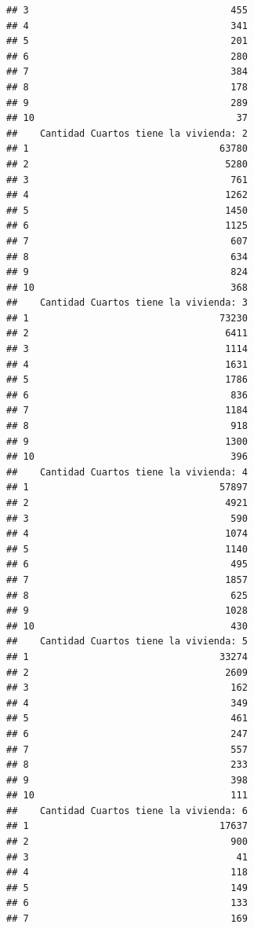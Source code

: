 \documentclass[11pt,]{article}
\begin{document}
\begin{verbatim}
## 3                                    455
## 4                                    341
## 5                                    201
## 6                                    280
## 7                                    384
## 8                                    178
## 9                                    289
## 10                                    37
##    Cantidad Cuartos tiene la vivienda: 2
## 1                                  63780
## 2                                   5280
## 3                                    761
## 4                                   1262
## 5                                   1450
## 6                                   1125
## 7                                    607
## 8                                    634
## 9                                    824
## 10                                   368
##    Cantidad Cuartos tiene la vivienda: 3
## 1                                  73230
## 2                                   6411
## 3                                   1114
## 4                                   1631
## 5                                   1786
## 6                                    836
## 7                                   1184
## 8                                    918
## 9                                   1300
## 10                                   396
##    Cantidad Cuartos tiene la vivienda: 4
## 1                                  57897
## 2                                   4921
## 3                                    590
## 4                                   1074
## 5                                   1140
## 6                                    495
## 7                                   1857
## 8                                    625
## 9                                   1028
## 10                                   430
##    Cantidad Cuartos tiene la vivienda: 5
## 1                                  33274
## 2                                   2609
## 3                                    162
## 4                                    349
## 5                                    461
## 6                                    247
## 7                                    557
## 8                                    233
## 9                                    398
## 10                                   111
##    Cantidad Cuartos tiene la vivienda: 6
## 1                                  17637
## 2                                    900
## 3                                     41
## 4                                    118
## 5                                    149
## 6                                    133
## 7                                    169

\end{verbatim}
\end{document}

